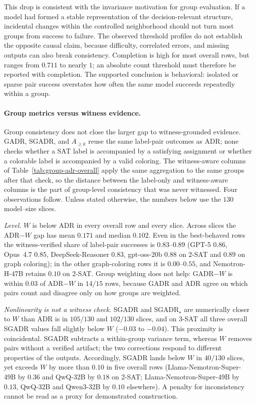 \documentclass[acmsmall,screen,review,anonymous]{acmart}
\begin{document}
This drop is consistent with the invariance motivation for group evaluation.
If a model had formed a stable representation of the decision-relevant
structure, incidental changes within the controlled neighborhood should not
turn most groups from success to failure. The observed threshold profiles do
not establish the opposite causal claim, because difficulty, correlated
errors, and missing outputs can also break consistency. Completion is high
for most overall rows, but ranges from \(0.711\) to nearly \(1\); an absolute
count threshold must therefore be reported with completion. The supported
conclusion is behavioral: isolated or sparse pair success overstates how
often the same model succeeds repeatedly within a group.

\paragraph{Group metrics versus witness evidence.}
Group consistency does not close the larger gap to witness-grounded
evidence. GADR, SGADR, and \(A_{\ge k}\) reuse the same label-pair outcomes as
ADR; none checks whether a SAT label is accompanied by a satisfying
assignment or whether a colorable label is accompanied by a valid coloring.
The witness-aware columns of Table~\ref{tab:group-adr-overall} apply the same
aggregation to the same groups after that check, so the distance between the
label-only and witness-aware columns is the part of group-level consistency
that was never witnessed. Four observations follow. Unless stated otherwise, the numbers below use the
\(130\) model--size slices.

\emph{Level.} \(W\) is below ADR in every overall row and every slice. Across
slices the ADR\(-W\) gap has mean \(0.171\) and median \(0.102\). Even in the
best-behaved rows the witness-verified share of label-pair successes is
\(0.83\)--\(0.89\) (GPT-5 \(0.86\), Opus~4.7 \(0.85\), DeepSeek-Reasoner
\(0.83\), gpt-oss-20b \(0.88\) on 2-SAT and \(0.89\) on graph coloring); in
the other graph-coloring rows it is \(0.00\)--\(0.55\), and Nemotron-H-47B
retains \(0.10\) on 2-SAT. Group weighting
does not help: GADR\(-W\) is within \(0.03\) of ADR\(-W\) in \(14/15\) rows,
because GADR and ADR agree on which pairs count and disagree only on how
groups are weighted.

\emph{Nonlinearity is not a witness check.} SGADR and
\(\mathrm{SGADR}_{\star}\) are numerically closer to \(W\) than ADR is in
\(105/130\) and \(102/130\) slices, and on 3-SAT all three overall SGADR
values fall slightly below \(W\) (\(-0.03\) to \(-0.04\)). This proximity is
coincidental. SGADR subtracts a within-group variance term, whereas \(W\)
removes pairs without a verified artifact; the two corrections respond to
different properties of the outputs. Accordingly, SGADR lands below \(W\) in
\(40/130\) slices, yet exceeds \(W\) by more than \(0.10\) in five overall
rows (Llama-Nemotron-Super-49B by \(0.36\) and QwQ-32B by \(0.18\) on 2-SAT;
Llama-Nemotron-Super-49B by \(0.13\), QwQ-32B and Qwen3-32B by \(0.10\)
elsewhere). A penalty for inconsistency cannot be read as a proxy for
demonstrated construction.
\end{document}
